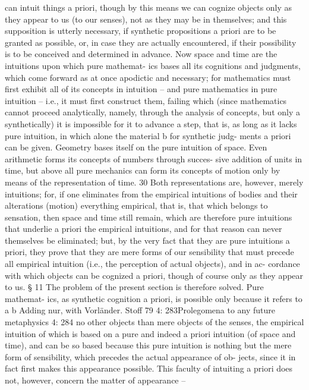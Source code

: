 can intuit things a priori, though by this means we can cognize objects
only as they appear to us (to our senses), not as they may be in themselves;
and this supposition is utterly necessary, if synthetic propositions a priori
are to be granted as possible, or, in case they are actually encountered,
if their possibility is to be conceived and determined in advance.
Now space and time are the intuitions upon which pure mathemat-
ics bases all its cognitions and judgments, which come forward as at
once apodictic and necessary; for mathematics must ﬁrst exhibit all of
its concepts in intuition – and pure mathematics in pure intuition – i.e.,
it must ﬁrst construct them, failing which (since mathematics cannot
proceed analytically, namely, through the analysis of concepts, but only a
synthetically) it is impossible for it to advance a step, that is, as long as
it lacks pure intuition, in which alone the material b for synthetic judg-
ments a priori can be given. Geometry bases itself on the pure intuition
of space. Even arithmetic forms its concepts of numbers through succes-
sive addition of units in time, but above all pure mechanics can form its
concepts of motion only by means of the representation of time. 30 Both
representations are, however, merely intuitions; for, if one eliminates
from the empirical intuitions of bodies and their alterations (motion)
everything empirical, that is, that which belongs to sensation, then space
and time still remain, which are therefore pure intuitions that underlie
a priori the empirical intuitions, and for that reason can never themselves
be eliminated; but, by the very fact that they are pure intuitions a priori,
they prove that they are mere forms of our sensibility that must precede
all empirical intuition (i.e., the perception of actual objects), and in ac-
cordance with which objects can be cognized a priori, though of course
only as they appear to us.
§ 11
The problem of the present section is therefore solved. Pure mathemat-
ics, as synthetic cognition a priori, is possible only because it refers to
a
b
Adding nur, with Vorländer.
Stoff
79
4: 283Prolegomena to any future metaphysics
4: 284
no other objects than mere objects of the senses, the empirical intuition
of which is based on a pure and indeed a priori intuition (of space and
time), and can be so based because this pure intuition is nothing but the
mere form of sensibility, which precedes the actual appearance of ob-
jects, since it in fact ﬁrst makes this appearance possible. This faculty of
intuiting a priori does not, however, concern the matter of appearance –
